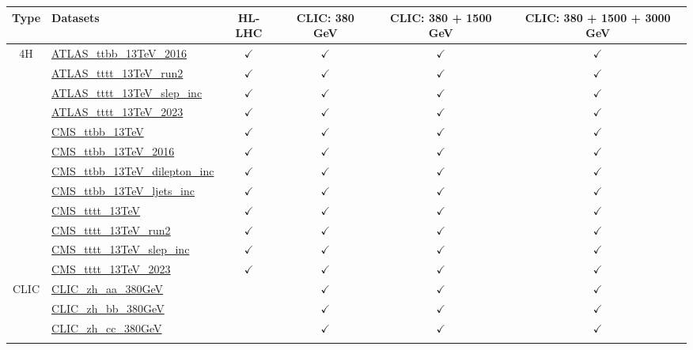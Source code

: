 \documentclass{article}
\begin{document}
\begin{longtable}{|c|l|c|c|c|c|}
\hline
\footnotesize
 Type & Datasets  & HL-LHC & CLIC: 380 GeV & CLIC: 380 + 1500 GeV & CLIC: 380 + 1500 + 3000 GeV \\ \hline
\multirow{12}{*}{4H}
 & \href{https://arxiv.org}{ATLAS_ttbb_13TeV_2016}  & $\checkmark$ & $\checkmark$ & $\checkmark$ & $\checkmark$\\ \cline{2-6}
 & \href{https://arxiv.org}{ATLAS_tttt_13TeV_run2}  & $\checkmark$ & $\checkmark$ & $\checkmark$ & $\checkmark$\\ \cline{2-6}
 & \href{https://arxiv.org}{ATLAS_tttt_13TeV_slep_inc}  & $\checkmark$ & $\checkmark$ & $\checkmark$ & $\checkmark$\\ \cline{2-6}
 & \href{https://arxiv.org}{ATLAS_tttt_13TeV_2023}  & $\checkmark$ & $\checkmark$ & $\checkmark$ & $\checkmark$\\ \cline{2-6}
 & \href{https://arxiv.org}{CMS_ttbb_13TeV}  & $\checkmark$ & $\checkmark$ & $\checkmark$ & $\checkmark$\\ \cline{2-6}
 & \href{https://arxiv.org}{CMS_ttbb_13TeV_2016}  & $\checkmark$ & $\checkmark$ & $\checkmark$ & $\checkmark$\\ \cline{2-6}
 & \href{https://arxiv.org}{CMS_ttbb_13TeV_dilepton_inc}  & $\checkmark$ & $\checkmark$ & $\checkmark$ & $\checkmark$\\ \cline{2-6}
 & \href{https://arxiv.org}{CMS_ttbb_13TeV_ljets_inc}  & $\checkmark$ & $\checkmark$ & $\checkmark$ & $\checkmark$\\ \cline{2-6}
 & \href{https://arxiv.org}{CMS_tttt_13TeV}  & $\checkmark$ & $\checkmark$ & $\checkmark$ & $\checkmark$\\ \cline{2-6}
 & \href{https://arxiv.org}{CMS_tttt_13TeV_run2}  & $\checkmark$ & $\checkmark$ & $\checkmark$ & $\checkmark$\\ \cline{2-6}
 & \href{https://arxiv.org}{CMS_tttt_13TeV_slep_inc}  & $\checkmark$ & $\checkmark$ & $\checkmark$ & $\checkmark$\\ \cline{2-6}
 & \href{https://arxiv.org}{CMS_tttt_13TeV_2023}  & $\checkmark$ & $\checkmark$ & $\checkmark$ & $\checkmark$
\\ \hline
\multirow{68}{*}{CLIC}
 & \href{https://arxiv.org}{CLIC_zh_aa_380GeV}  &  & $\checkmark$ & $\checkmark$ & $\checkmark$\\ \cline{2-6}
 & \href{https://arxiv.org}{CLIC_zh_bb_380GeV}  &  & $\checkmark$ & $\checkmark$ & $\checkmark$\\ \cline{2-6}
 & \href{https://arxiv.org}{CLIC_zh_cc_380GeV}  &  & $\checkmark$ & $\checkmark$ & $\checkmark$\\ \cline{2-6}

\end{longtable}
\end{document}
